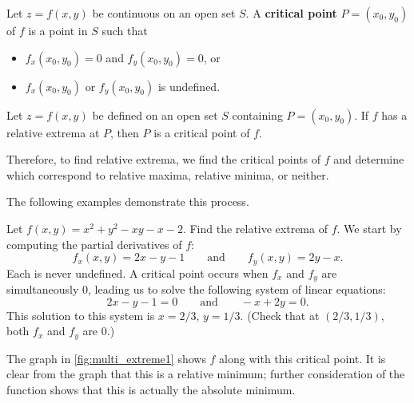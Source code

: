 \begin{definition}\label{def:multi_critical_point}
Let $z = f(x,y)$ be continuous on an open set $S$. A \textbf{critical point} $P=(x_0,y_0)$ of $f$ is a point in $S$ such that
\begin{itemize}
	\item $f_x(x_0,y_0) = 0$ and $f_y(x_0,y_0) = 0$, or
	\item	$f_x(x_0,y_0)$ or $f_y(x_0,y_0)$ is undefined.
\end{itemize}
\end{definition}

\begin{theorem}\label{thm:multi_critical_point}
Let $z=f(x,y)$ be defined on an open set $S$ containing $P=(x_0,y_0)$. If $f$ has a relative extrema at $P$, then $P$ is a critical point of $f$.
\end{theorem}

Therefore, to find relative extrema, we find the critical points of $f$ and determine which correspond to relative maxima, relative minima, or neither.


The following examples demonstrate this process.

\begin{example}\label{ex_multi_extreme1}
Let $f(x,y) = x^2+y^2-xy-x-2$. Find the relative extrema of $f$.
\solution
We start by computing the partial derivatives of $f$:
%
%
\[f_x(x,y) = 2x-y-1 \qquad \text{and}\qquad f_y(x,y) = 2y-x.\]
Each is never undefined. A critical point occurs when $f_x$ and $f_y$ are simultaneously 0, leading us to solve the following system of linear equations:
\[2x-y-1 = 0\qquad \text{and}\qquad -x+2y = 0.\]
This solution to this system is $x=2/3$, $y=1/3$. (Check that at $(2/3,1/3)$, both $f_x$ and $f_y$ are 0.)

The graph in \autoref{fig:multi_extreme1} shows $f$ along with this critical point. It is clear from the graph that this is a relative minimum; further consideration of the function shows that this is actually the absolute minimum.
\end{example}

